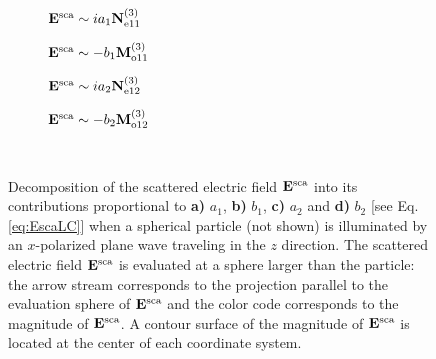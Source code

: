 \begin{figure}[h!]
	\def\svgwidth{1\textwidth} \small
  \vspace*{3.0em}
  \hspace*{0.em}
    \begin{subfigure}{.24\textwidth}\caption{\centering $\vb{E}^\text{sca} \sim  i a_1 \vb{N}^{(3)}_{\text{e}11}$}\label{fig:VSH:a1}\end{subfigure}
  	\begin{subfigure}{.24\textwidth}\caption{\centering $\vb{E}^\text{sca} \sim  - b_1 \vb{M}^{(3)}_{\text{o}11}$}\label{fig:VSH:b1}\end{subfigure}
	\begin{subfigure}{.24\textwidth}\caption{\centering $\vb{E}^\text{sca} \sim  i a_2 \vb{N}^{(3)}_{\text{e}12}$}\label{fig:VSH:a2}\end{subfigure}
	\begin{subfigure}{.24\textwidth}\caption{\centering $\vb{E}^\text{sca} \sim  - b_2 \vb{M}^{(3)}_{\text{o}12}$}\label{fig:VSH:b2}\end{subfigure}
  \vspace*{-6.em}\\
  \vspace*{-2em}
  \caption[Multipolar Contributions to the Scattered Electric Field]{ Decomposition of the  scattered electric field $\vb{E}^\text{sca}$ into its contributions  proportional to \textbf{a)} $a_1$,  \textbf{b)}  $b_1$, \textbf{c)} $a_2$ and \textbf{d)} $b_2$ [see Eq. \eqref{eq:EscaLC}] when a spherical particle (not shown) is illuminated by an $x$-polarized plane wave traveling in the $z$ direction. The scattered electric field $\vb{E}^\text{sca}$ is evaluated at a sphere larger than the particle: the arrow stream corresponds to the projection parallel to the evaluation sphere of $\vb{E}^\text{sca}$  and the color code corresponds to the magnitude of  $\vb{E}^\text{sca}$. A contour surface of the magnitude of $\vb{E}^\text{sca}$ is located at the center of each coordinate system. }
\label{fig:Multipoles}
\end{figure}

